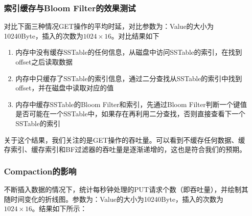 \documentclass[fontset=windows]{article}
\begin{document}
\subsubsection{索引缓存与Bloom Filter的效果测试}
对比下面三种情况GET操作的平均时延，对比参数为：Value的大小为10240Byte，插入的次数为$1024 \times 16$。对比结果如下
\begin{enumerate}
    \item 内存中没有缓存SSTable的任何信息，从磁盘中访问SSTable的索引，在找到offset之后读取数据
    \item 内存中只缓存了SSTable的索引信息，通过二分查找从SSTable的索引中找到offset，并在磁盘中读取对应的值
    \item 内存中缓存SSTable的Bloom Filter和索引，先通过Bloom Filter判断一个键值是否可能在一个SSTable中，如果存在再利用二分查找，否则直接查看下一个SSTable的索引
\end{enumerate}

\begin{table}[h]
  \centering
  \caption{吞吐量和缓存策略的关系}
\end{table}

关于这个结果，我们关注的是GET操作的吞吐量。可以看到不缓存任何数据、缓存索引、缓存索引和BF过滤器的吞吐量是逐渐递增的，这也是符合我们的预期。


\subsubsection{Compaction的影响}
不断插入数据的情况下，统计每秒钟处理的PUT请求个数（即吞吐量），并绘制其随时间变化的折线图。参数为：Value的大小为10240Byte，插入的次数为$1024 \times 16$。结果如下所示：
\end{document}
